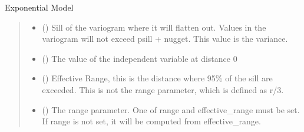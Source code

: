 \documentclass[letterpaper,10pt,english]{sphinxmanual}
\begin{document}
\begin{fulllineitems}
\label{\detokenize{covariance:glomar_gridding.variogram.ExponentialVariogram}}
\pysigstartsignatures
\pysiglinewithargsret
{}
{\sphinxparamcomma {}\sphinxparamcomma {}\sphinxparamcomma {}}
{}
\pysigstopsignatures
\sphinxAtStartPar
Exponential Model
\begin{quote}\begin{description}
\begin{itemize}
\item {}
\sphinxAtStartPar
{} (\sphinxstyleliteralemphasis{\sphinxupquote{ | }}) \textendash{} Sill of the variogram where it will flatten out. Values in the variogram
will not exceed psill + nugget. This value is the variance.

\item {}
\sphinxAtStartPar
{} (\sphinxstyleliteralemphasis{\sphinxupquote{ | }}) \textendash{} The value of the independent variable at distance 0

\item {}
\sphinxAtStartPar
{} (\sphinxstyleliteralemphasis{\sphinxupquote{ | }}\sphinxstyleliteralemphasis{\sphinxupquote{ | }}) \textendash{} Effective Range, this is the distance where 95\% of the sill are
exceeded. This is not the range parameter, which is defined as r/3.

\item {}
\sphinxAtStartPar
{} (\sphinxstyleliteralemphasis{\sphinxupquote{ | }}\sphinxstyleliteralemphasis{\sphinxupquote{ | }}) \textendash{} The range parameter. One of range and effective\_range must be set. If
range is not set, it will be computed from effective\_range.


\end{itemize}
\end{description}
\end{quote}
\end{fulllineitems}
\end{document}
